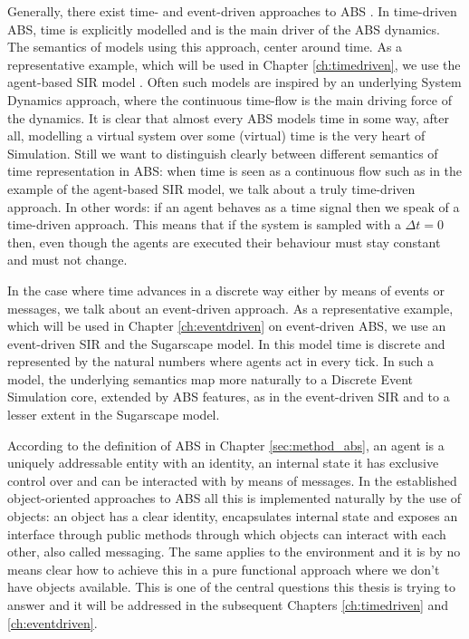 Generally, there exist time- and event-driven approaches to ABS \cite{meyer_event-driven_2014}. In time-driven ABS, time is explicitly modelled and is the main driver of the ABS dynamics. The semantics of models using this approach, center around time. As a representative example, which will be used in Chapter \ref{ch:timedriven}, we use the agent-based SIR model \cite{macal_agent-based_2010, thaler_pure_2018}. Often such models are inspired by an underlying System Dynamics approach, where the continuous time-flow is the main driving force of the dynamics. It is clear that almost every ABS models time in some way, after all, modelling a virtual system over some (virtual) time is the very heart of Simulation. Still we want to distinguish clearly between different semantics of time representation in ABS: when time is seen as a continuous flow such as in the example of the agent-based SIR model, we talk about a truly time-driven approach. In other words: if an agent behaves as a time signal then we speak of a time-driven approach. This means that if the system is sampled with a $\Delta t = 0$ then, even though the agents are executed their behaviour must stay constant and must not change.

In the case where time advances in a discrete way either by means of events or messages, we talk about an event-driven approach. As a representative example, which will be used in Chapter \ref{ch:eventdriven} on event-driven ABS, we use an event-driven SIR and the Sugarscape model. In this model time is discrete and represented by the natural numbers where agents act in every tick. In such a model, the underlying semantics map more naturally to a Discrete Event Simulation core, extended by ABS features, as in the event-driven SIR and to a lesser extent in the Sugarscape model.

According to the definition of ABS in  Chapter \ref{sec:method_abs}, an agent is a uniquely addressable entity with an identity, an internal state it has exclusive control over and can be interacted with by means of messages. In the established object-oriented approaches to ABS all this is implemented naturally by the use of objects: an object has a clear identity, encapsulates internal state and exposes an interface through public methods through which objects can interact with each other, also called messaging. The same applies to the environment and it is by no means clear how to achieve this in a pure functional approach where we don't have objects available. This is one of the central questions this thesis is trying to answer and it will be addressed in the subsequent Chapters \ref{ch:timedriven} and \ref{ch:eventdriven}.

